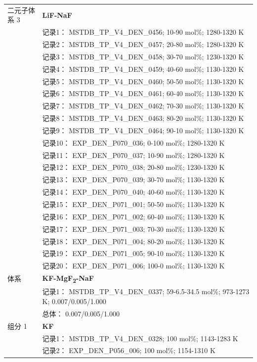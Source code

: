 \documentclass[12pt]{article}
\begin{document}
{\begin{longtable}[]{@{}
  >{\raggedright\arraybackslash}p{}
  >{\raggedright\arraybackslash}p{}@{}}
二元子体系 3  & \textbf{LiF-NaF} \\
 & 记录1： MSTDB\_TP\_V4\_DEN\_0456; 10-90 mol\%; 1280-1320 K \\
 & 记录2： MSTDB\_TP\_V4\_DEN\_0457; 20-80 mol\%; 1280-1320 K \\
 & 记录3： MSTDB\_TP\_V4\_DEN\_0458; 30-70 mol\%; 1230-1320 K \\
 & 记录4： MSTDB\_TP\_V4\_DEN\_0459; 40-60 mol\%; 1130-1320 K \\
 & 记录5： MSTDB\_TP\_V4\_DEN\_0460; 50-50 mol\%; 1130-1320 K \\
 & 记录6： MSTDB\_TP\_V4\_DEN\_0461; 60-40 mol\%; 1130-1320 K \\
 & 记录7： MSTDB\_TP\_V4\_DEN\_0462; 70-30 mol\%; 1130-1320 K \\
 & 记录8： MSTDB\_TP\_V4\_DEN\_0463; 80-20 mol\%; 1130-1320 K \\
 & 记录9： MSTDB\_TP\_V4\_DEN\_0464; 90-10 mol\%; 1130-1320 K \\
 & 记录10： EXP\_DEN\_P070\_036; 0-100 mol\%; 1280-1320 K \\
 & 记录11： EXP\_DEN\_P070\_037; 10-90 mol\%; 1280-1320 K \\
 & 记录12： EXP\_DEN\_P070\_038; 20-80 mol\%; 1230-1320 K \\
 & 记录13： EXP\_DEN\_P070\_039; 30-70 mol\%; 1130-1320 K \\
 & 记录14： EXP\_DEN\_P070\_040; 40-60 mol\%; 1130-1320 K \\
 & 记录15： EXP\_DEN\_P071\_001; 50-50 mol\%; 1130-1320 K \\
 & 记录16： EXP\_DEN\_P071\_002; 60-40 mol\%; 1130-1320 K \\
 & 记录17： EXP\_DEN\_P071\_003; 70-30 mol\%; 1130-1320 K \\
 & 记录18： EXP\_DEN\_P071\_004; 80-20 mol\%; 1130-1320 K \\
 & 记录19： EXP\_DEN\_P071\_005; 90-10 mol\%; 1130-1320 K \\
 & 记录20： EXP\_DEN\_P071\_006; 100-0 mol\%; 1130-1320 K  \\

\midrule
体系 & \textbf{KF-MgF\textsubscript{2}-NaF} \\
 & 记录1： MSTDB\_TP\_V4\_DEN\_0337; 59-6.5-34.5 mol\%; 973-1273 K; 0.007/0.005/1.000 \\
 & 总体： 0.007/0.005/1.000  \\

组分 1  & \textbf{KF} \\
 & 记录1： MSTDB\_TP\_V4\_DEN\_0328; 100 mol\%; 1143-1283 K \\
 & 记录2： EXP\_DEN\_P056\_006; 100 mol\%; 1154-1310 K  \\


\end{longtable}}
\end{document}
